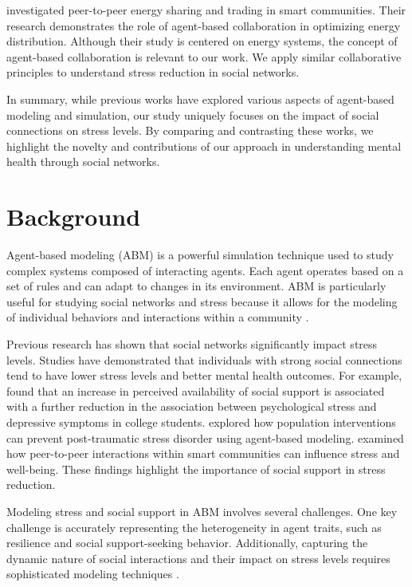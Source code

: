 \documentclass{article} %
\begin{document}
\citet{zhou2023peer} investigated peer-to-peer energy sharing and trading in smart communities. Their research demonstrates the role of agent-based collaboration in optimizing energy distribution. Although their study is centered on energy systems, the concept of agent-based collaboration is relevant to our work. We apply similar collaborative principles to understand stress reduction in social networks.

In summary, while previous works have explored various aspects of agent-based modeling and simulation, our study uniquely focuses on the impact of social connections on stress levels. By comparing and contrasting these works, we highlight the novelty and contributions of our approach in understanding mental health through social networks.

\section{Background}
\label{sec:background}

Agent-based modeling (ABM) is a powerful simulation technique used to study complex systems composed of interacting agents. Each agent operates based on a set of rules and can adapt to changes in its environment. ABM is particularly useful for studying social networks and stress because it allows for the modeling of individual behaviors and interactions within a community \citep{west2023agent}.

Previous research has shown that social networks significantly impact stress levels. Studies have demonstrated that individuals with strong social connections tend to have lower stress levels and better mental health outcomes. For example, \citet{Cohen2004IncreaseIP} found that an increase in perceived availability of social support is associated with a further reduction in the association between psychological stress and depressive symptoms in college students. \citet{Mooney2021GcomputationAA} explored how population interventions can prevent post-traumatic stress disorder using agent-based modeling. \citet{zhou2023peer} examined how peer-to-peer interactions within smart communities can influence stress and well-being. These findings highlight the importance of social support in stress reduction.

Modeling stress and social support in ABM involves several challenges. One key challenge is accurately representing the heterogeneity in agent traits, such as resilience and social support-seeking behavior. Additionally, capturing the dynamic nature of social interactions and their impact on stress levels requires sophisticated modeling techniques \citep{liu2023agentbench}.
\end{document}
